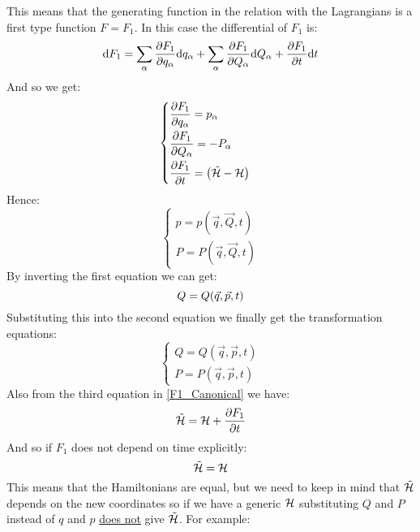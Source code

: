 This means that the generating function in the relation with the Lagrangians is a first type function $F = F_1$. In this case the differential of $F_1$ is:
\begin{equation}
    \mathrm{d}F_1 = \displaystyle\sum_{\alpha} \dfrac{\partial F_1}{\partial q_{\alpha}} \mathrm{d}q_{\alpha} + \displaystyle\sum_{\alpha} \dfrac{\partial F_1}{\partial Q_{\alpha}} \mathrm{d}Q_{\alpha} + \dfrac{\partial F_1}{\partial t} \mathrm{d}t
\end{equation}
And so we get:
\begin{equation} \label{F1_Canonical}
    \begin{cases}
        \dfrac{\partial F_1}{\partial q_{\alpha}} = p_{\alpha}\\[8pt]
        \dfrac{\partial F_1}{\partial Q_{\alpha}} = -P_{\alpha}\\[8pt]
        \dfrac{\partial F_1}{\partial t} = \left(\tilde{\mathcal{H}}- \mathcal{H}\right)
    \end{cases}
\end{equation}
Hence:
\begin{equation}
    \begin{cases}
        p = p(\vec{q},\vec{Q},t)\\
        P = P(\vec{q},\vec{Q},t)
    \end{cases}
\end{equation}
By inverting the first equation we can get:
\begin{equation}
    Q = Q(\vec{q},\vec{p},t)\\
\end{equation}
Substituting this into the second equation we finally get the transformation equations:
\begin{equation}
    \begin{cases}
        Q = Q(\vec{q},\vec{p},t)\\
        P = P(\vec{q},\vec{p},t)
    \end{cases}
\end{equation}
Also from the third equation in \eqref{F1_Canonical} we have:
\begin{equation}
    \tilde{\mathcal{H}} = \mathcal{H} + \dfrac{\partial F_1}{\partial t}
\end{equation}
And so if $F_1$ does not depend on time explicitly:
\begin{equation}
    \tilde{\mathcal{H}} = \mathcal{H}
\end{equation}
This means that the Hamiltonians are equal, but we need to keep in mind that $\tilde{\mathcal{H}}$ depends on the new coordinates so if we have a generic $\mathcal{H}$ substituting $Q$ and $P$ instead of $q$ and $p$ \underline{does not} give $\tilde{\mathcal{H}}$. For example:

